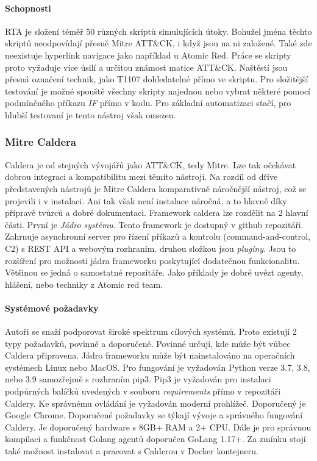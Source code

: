 \paragraph{Schopnosti}
\ac{RTA} je složení téměř 50 různých skriptů simulujících útoky.
Bohužel jména těchto skriptů neodpovídají přesně Mitre ATT\&CK, i když jsou na ni založené.
Také zde neexistuje hyperlink navigace jako například u Atomic Red.
Práce se skripty proto vyžaduje více úsilí a určitou známost matice ATT\&CK\@.
Naštěstí jsou přesná označení technik, jako T1107 dohledatelné přímo ve skriptu.
Pro složitější testování je možné spouště všechny skripty najednou nebo vybrat některé pomocí podmíněného příkazu \textit{IF} přímo v kodu.
Pro základní automatizaci stačí, pro hlubší testovaní je tento nástroj však omezen.\cite{csoonline_4_testing_frameworks}



\subsubsection{Mitre Caldera}
Caldera je od stejných vývojářů jako ATT\&CK, tedy Mitre.
Lze tak očekávat dobrou integraci a kompatibilitu mezi těmito nástroji.
Na rozdíl od dříve představených nástrojů je Mitre Caldera komparativně náročnější nástroj, což se projevili i v instalaci.
Ani tak však není instalace náročná, a to hlavně díky přípravě tvůrců a dobré dokumentaci\cite{mitre_caldera_docs}.
Framework caldera lze rozdělit na 2 hlavní části.
První je \textit{Jádro systému}.
Tento framework je dostupný v github repozitáři.
Zahrnuje asynchronní server pro řízení příkazů a kontrolu (command-and-control, C2) s REST API a webovým rozhraním.
druhou složkou jsou \textit{pluginy}.
Jsou to rozšíření pro možnosti jádra frameworku poskytující dodatečnou funkcionalitu.
Většinou se jedná o samostatné repozitáře.
Jako příklady je dobré uvézt agenty, hlášení, nebo  techniky z Atomic red team.\cite{mitre_caldera}

\paragraph{Systémové požadavky}
Autoři se snaží podporovat široké spektrum cílových systémů.
Proto existují 2 typy požadavků, povinné a doporučené.
Povinné určují, kde může být vůbec Caldera připravena.
Jádro frameworku může být nainstalováno na operačních systémech Linux nebo MacOS.
Pro fungování je vyžadován Python verze 3.7, 3.8, nebo 3.9 samozřejmě s rozhraním pip3.
Pip3 je vyžadován pro instalaci podpůrných balíčků uvedených v souboru \textit{requirements} přímo v repozitáři Caldery.
Ke správnému ovládání je vyžadován moderní prohlížeč.
Doporučený je Google Chrome.
Doporučené požadavky se týkají vývoje a správného fungování Caldery.
Je doporučený hardware s 8GB+ RAM a 2+ CPU\@.
Dále je pro správnou kompilaci a funkčnost Golang agentů doporučen GoLang 1.17+.
Za zmínku stojí také možnost instalovat a pracovat s Calderou v Docker kontejneru.\cite{mitre_caldera_docs}


